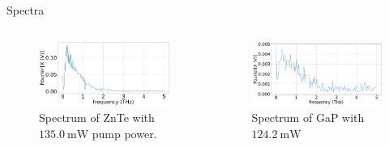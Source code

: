 \documentclass[aspectratio=1610, 9pt]{beamer}
\begin{document}
\begin{frame}{Spectra}
  \begin{columns}
    \begin{column}{.5\textwidth}
  \begin{figure}
    \includegraphics[width=\textwidth]{images/2_11_30_20normalFX.pdf}
    \caption{\textcolor{tugreen}{Spectrum} of ZnTe with $\SI{135.0}{\milli\W}$ pump power.}
  \end{figure}
  \end{column}
  \begin{column}{.5\textwidth}
    \begin{figure}
      \includegraphics[width=\textwidth]{images/GaP14_55_42normalFX.pdf}
      \caption{\textcolor{tugreen}{Spectrum} of GaP with $\SI{124.2}{\milli\W }$}
    \end{figure}    
  \end{column}
  \end{columns}
\end{frame}
\end{document}
